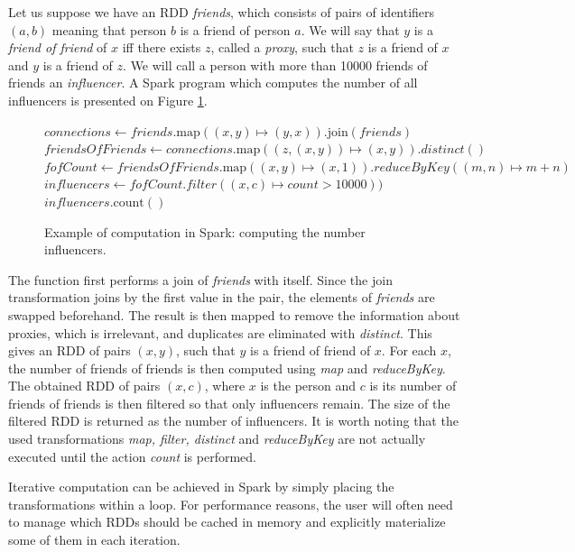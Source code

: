 \begin{exmp}
Let us suppose we have an RDD \emph{friends}, which consists of pairs of identifiers $(a, b)$ meaning that person $b$ is a friend of person $a$. We will say that $y$ is a \emph{friend of friend} of $x$ iff there exists $z$, called a \emph{proxy}, such that $z$ is a friend of $x$ and $y$ is a friend of $z$. We will call a person with more than 10000 friends of friends an \emph{influencer}. A Spark program which computes the number of all influencers is presented on Figure \ref{ex:sparkfof}.

\begin{figure}[!htbp]
\begin{codebox}
  \li $\textit{connections} \leftarrow \textit{friends}.\text{map}((x, y) \mapsto (y, x)).\text{join}(\textit{friends})$
  \li $\textit{friendsOfFriends} \leftarrow \textit{connections}.\text{map}((z, (x, y)) \mapsto (x, y)).distinct()$ 
  \li $\textit{fofCount} \leftarrow \textit{friendsOfFriends}.\text{map}((x, y) \mapsto (x, 1)).reduceByKey((m, n) \mapsto m+n)$
  \li $\textit{influencers} \leftarrow fofCount.filter((x, c) \mapsto count > 10000))$
  \li \Return $\textit{influencers}.\text{count}()$
\end{codebox}
\caption{Example of computation in Spark: computing the number influencers.}\label{ex:sparkfof}
\end{figure}

The  function first performs a join of \emph{friends} with itself. Since the join transformation joins by the first value in the pair, the elements of \emph{friends} are swapped beforehand. The result is then mapped to remove the information about proxies, which is irrelevant, and duplicates are eliminated with \emph{distinct}. This gives an RDD of pairs $(x, y)$, such that $y$ is a friend of friend of $x$. For each $x$, the number of friends of friends is then computed using \emph{map} and \emph{reduceByKey}. The obtained RDD of pairs $(x, c)$, where $x$ is the person and $c$ is its number of friends of friends is then filtered so that only influencers remain. The size of the filtered RDD is returned as the number of influencers. It is worth noting that the used transformations \emph{map, filter, distinct} and \emph{reduceByKey} are not actually executed until the action \emph{count} is performed.

Iterative computation can be achieved in Spark by simply placing the transformations within a loop. For performance reasons, the user will often need to manage which RDDs should be cached in memory and explicitly materialize some of them in each iteration.
\end{exmp}

